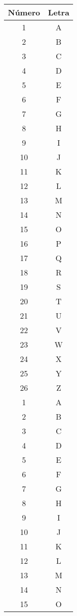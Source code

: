 \begin{center}
\centering
	\begin{longtable}{|c|c|}
	\hline
	Número & Letra \\
	\hline \endhead
	1 & A \\
	\hline
	2 & B \\
	\hline
	3 & C \\
	\hline
	4 & D \\
	\hline
	5 & E \\
	\hline
	6 & F \\
	\hline
	7 & G \\
	\hline
	8 & H \\
	\hline
	9 & I \\
	\hline
	10 & J \\
	\hline
	11 & K \\
	\hline
	12 & L \\
	\hline
	13 & M \\
	\hline
	14 & N \\
	\hline
	15 & O \\
	\hline
	16 & P \\
	\hline
	17 & Q \\
	\hline
	18 & R \\
	\hline
	19 & S \\
	\hline
	20 & T \\
	\hline
	21 & U \\
	\hline
	22 & V \\
	\hline
	23 & W \\
	\hline
	24 & X \\
	\hline
	25 & Y \\
	\hline
	26 & Z \\
	\hline
	1 & A \\
	\hline
	2 & B \\
	\hline
	3 & C \\
	\hline
	4 & D \\
	\hline
	5 & E \\
	\hline
	6 & F \\
	\hline
	7 & G \\
	\hline
	8 & H \\
	\hline
	9 & I \\
	\hline
	10 & J \\
	\hline
	11 & K \\
	\hline
	12 & L \\
	\hline
	13 & M \\
	\hline
	14 & N \\
	\hline
	15 & O \\

\end{longtable}
\end{center}
